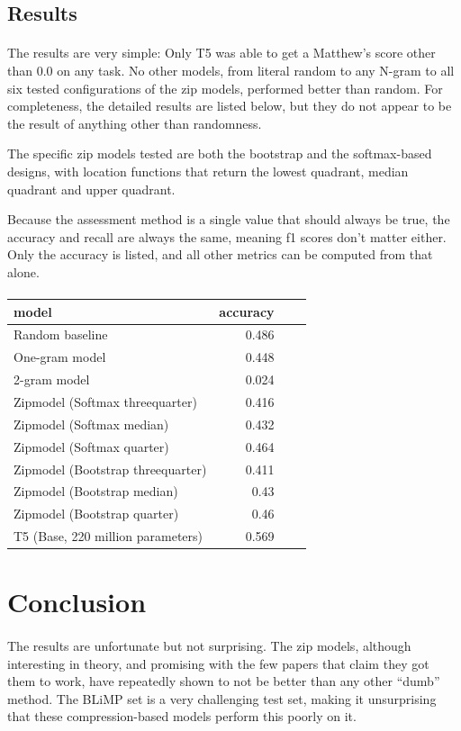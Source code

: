 \documentclass[11pt]{article}
\begin{document}
\subsection{Results}
\paragraph{}
The results are very simple: Only T5 was able to get a Matthew's score other than 0.0 on any task. No other models, from literal random to any N-gram to all six tested configurations of the zip models, performed better than random. For completeness, the detailed results are listed below, but they do not appear to be the result of anything other than randomness.

The specific zip models tested are both the bootstrap and the softmax-based designs, with location functions that return the lowest quadrant, median quadrant and upper quadrant.

Because the assessment method is a single value that should always be true, the accuracy and recall are always the same, meaning f1 scores don't matter either. Only the accuracy is listed, and all other metrics can be computed from that alone.

\paragraph{}
\begin{tabular}{lrrr}
\toprule
model & accuracy \\
\midrule
Random baseline & 0.486 \\
One-gram model & 0.448 \\
2-gram model & 0.024 \\
\midrule
Zipmodel (Softmax threequarter) & 0.416 \\
Zipmodel (Softmax median) & 0.432 \\
Zipmodel (Softmax quarter) & 0.464 \\
Zipmodel (Bootstrap threequarter) & 0.411 \\
Zipmodel (Bootstrap median) & 0.43 \\
Zipmodel (Bootstrap quarter) & 0.46 \\
\midrule
T5 (Base, 220 million parameters) & 0.569 \\
\bottomrule
\end{tabular}

\section{Conclusion}
\paragraph{}
The results are unfortunate but not surprising. The zip models, although interesting in theory, and promising with the few papers that claim they got them to work, have repeatedly shown to not be better than any other ``dumb'' method. The BLiMP set is a very challenging test set, making it unsurprising that these compression-based models perform this poorly on it.

\printbibliography
\end{document}
